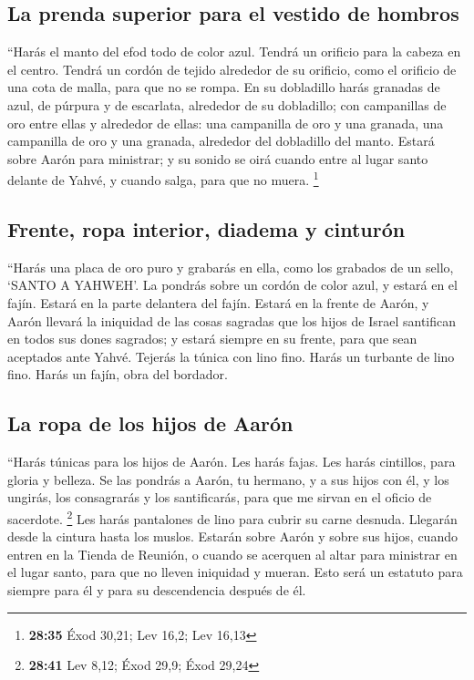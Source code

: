 \begin{paracol}{2}
\hypertarget{la-prenda-superior-para-el-vestido-de-hombros}{%
\subsection{La prenda superior para el vestido de
hombros}\label{la-prenda-superior-para-el-vestido-de-hombros}}

 ``Harás el manto del efod todo de color azul.
 Tendrá un orificio para la cabeza en el centro. Tendrá
un cordón de tejido alrededor de su orificio, como el orificio de una
cota de malla, para que no se rompa.  En su dobladillo
harás granadas de azul, de púrpura y de escarlata, alrededor de su
dobladillo; con campanillas de oro entre ellas y alrededor de ellas:
 una campanilla de oro y una granada, una campanilla de
oro y una granada, alrededor del dobladillo del manto. 
Estará sobre Aarón para ministrar; y su sonido se oirá cuando entre al
lugar santo delante de Yahvé, y cuando salga, para que no muera.
\footnote{\textbf{28:35} Éxod 30,21; Lev 16,2; Lev 16,13}

\hypertarget{frente-ropa-interior-diadema-y-cinturuxf3n}{%
\subsection{Frente, ropa interior, diadema y
cinturón}\label{frente-ropa-interior-diadema-y-cinturuxf3n}}

 ``Harás una placa de oro puro y grabarás en ella, como
los grabados de un sello, `SANTO A YAHWEH'.  La pondrás
sobre un cordón de color azul, y estará en el fajín. Estará en la parte
delantera del fajín.  Estará en la frente de Aarón, y
Aarón llevará la iniquidad de las cosas sagradas que los hijos de Israel
santifican en todos sus dones sagrados; y estará siempre en su frente,
para que sean aceptados ante Yahvé.  Tejerás la túnica
con lino fino. Harás un turbante de lino fino. Harás un fajín, obra del
bordador.

\hypertarget{la-ropa-de-los-hijos-de-aaruxf3n}{%
\subsection{La ropa de los hijos de
Aarón}\label{la-ropa-de-los-hijos-de-aaruxf3n}}

 ``Harás túnicas para los hijos de Aarón. Les harás
fajas. Les harás cintillos, para gloria y belleza.  Se
las pondrás a Aarón, tu hermano, y a sus hijos con él, y los ungirás,
los consagrarás y los santificarás, para que me sirvan en el oficio de
sacerdote. \footnote{\textbf{28:41} Lev 8,12; Éxod 29,9; Éxod 29,24}
 Les harás pantalones de lino para cubrir su carne
desnuda. Llegarán desde la cintura hasta los muslos. 
Estarán sobre Aarón y sobre sus hijos, cuando entren en la Tienda de
Reunión, o cuando se acerquen al altar para ministrar en el lugar santo,
para que no lleven iniquidad y mueran. Esto será un estatuto para
siempre para él y para su descendencia después de él.


\end{paracol}
